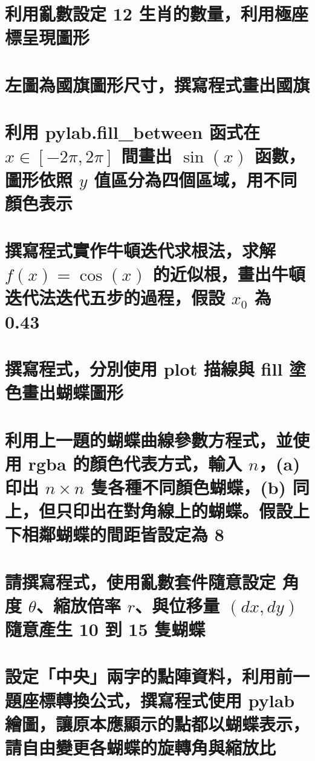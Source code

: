 \section{利用亂數設定 12 生肖的數量，利用極座標呈現圖形}


\section{左圖為國旗圖形尺寸，撰寫程式畫出國旗}


\section{利用 pylab.fill\_between 函式在 $x\in [-2\pi,2\pi]$ 間畫出 $\sin(x)$ 函數，圖形依照 $y$ 值區分為四個區域，用不同顏色表示}


\section{撰寫程式實作牛頓迭代求根法，求解 $f(x) = \cos(x)$ 的近似根，畫出牛頓迭代法迭代五步的過程，假設 $x_0$ 為 0.43}


\section{撰寫程式，分別使用 plot 描線與 fill 塗色畫出蝴蝶圖形}


\section{利用上一題的蝴蝶曲線參數方程式，並使用 rgba 的顏色代表方式，輸入 $n$，(a) 印出 $n\times n$ 隻各種不同顏色蝴蝶，(b) 同上，但只印出在對角線上的蝴蝶。假設上下相鄰蝴蝶的間距皆設定為 8}


\section{請撰寫程式，使用亂數套件隨意設定 角度 $\theta$、縮放倍率 $r$、與位移量 $(dx, dy)$ 隨意產生 10 到 15 隻蝴蝶}


\section{設定「中央」兩字的點陣資料，利用前一題座標轉換公式，撰寫程式使用 pylab 繪圖，讓原本應顯示的點都以蝴蝶表示，請自由變更各蝴蝶的旋轉角與縮放比}


